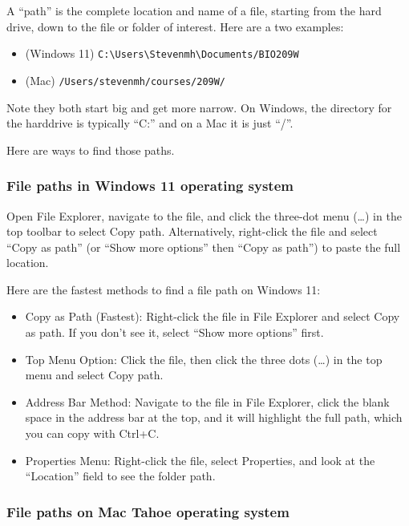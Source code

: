 \documentclass[
  letterpaper,
  DIV=11,
  numbers=noendperiod]{scrreprt}
\providecommand{\tightlist}{%
  \setlength{\itemsep}{0pt}\setlength{\parskip}{0pt}}
\begin{document}
A ``path'' is the complete location and name of a file, starting from
the hard drive, down to the file or folder of interest. Here are a two
examples:

\begin{itemize}
\tightlist
\item
  (Windows 11)
  \texttt{C:\textbackslash{}Users\textbackslash{}Stevenmh\textbackslash{}Documents/BIO209W}
\item
  (Mac) \texttt{/Users/stevenmh/courses/209W/}
\end{itemize}

Note they both start big and get more narrow. On Windows, the directory
for the harddrive is typically ``C:'' and on a Mac it is just ``/''.

Here are ways to find those paths.

\subsubsection{File paths in Windows 11 operating
system}\label{file-paths-in-windows-11-operating-system}

Open File Explorer, navigate to the file, and click the three-dot menu
(\ldots) in the top toolbar to select Copy path. Alternatively,
right-click the file and select ``Copy as path'' (or ``Show more
options'' then ``Copy as path'') to paste the full location.

Here are the fastest methods to find a file path on Windows 11:

\begin{itemize}
\tightlist
\item
  Copy as Path (Fastest): Right-click the file in File Explorer and
  select Copy as path. If you don't see it, select ``Show more options''
  first.
\item
  Top Menu Option: Click the file, then click the three dots (\ldots) in
  the top menu and select Copy path.
\item
  Address Bar Method: Navigate to the file in File Explorer, click the
  blank space in the address bar at the top, and it will highlight the
  full path, which you can copy with Ctrl+C.
\item
  Properties Menu: Right-click the file, select Properties, and look at
  the ``Location'' field to see the folder path.
\end{itemize}

\subsubsection{File paths on Mac Tahoe operating
system}\label{file-paths-on-mac-tahoe-operating-system}
\end{document}

